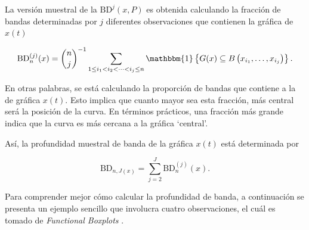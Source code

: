 La versión muestral de la $\mathrm{BD}^{j}(x, P)$ es obtenida calculando la fracción de bandas determinadas por $j$ diferentes observaciones que contienen la gráfica de $x(t)$

\begin{equation}
    \mathrm{BD}_n^{(j)}(x)= \binom{n}{j}^{-1} \sum_{1 \leq i_1<i_2<\cdots<i_j \leq n} \mathbbm{1}\left\{G(x) \subseteq B\left(x_{i_1}, \ldots, x_{i_j}\right)\right\}.
\end{equation}

En otras palabras, se está calculando la proporción de bandas que contiene a la de gráfica $x(t)$. Esto implica que cuanto mayor sea esta fracción, más central será la posición de la curva. En términos prácticos, una fracción más grande indica que la curva es más cercana a la gráfica `central'.

Así, la profundidad muestral de banda de la gráfica $x(t)$ está determinada por

\begin{equation}
    \mathrm{BD}_{n, J(x)} = \sum_{j = 2}^{J} \mathrm{BD}_n^{(j)}(x).
\end{equation}

Para comprender mejor cómo calcular la profundidad de banda, a continuación se presenta un ejemplo sencillo que involucra cuatro observaciones, el cuál es tomado de \textit{Functional Boxplots} \cite{boxplotFun}.

